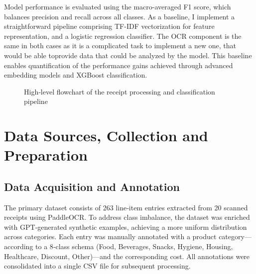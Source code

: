 \documentclass{SGGW-thesis-EN}
\begin{document}
Model performance is evaluated using the macro-averaged F1 score, which balances precision and recall across all classes. 
As a baseline, I implement a straightforward pipeline comprising TF-IDF vectorization for feature representation, 
and a logistic regression classifier. The OCR component is the same in both cases as it is a complicated task to implement a new one, 
that would be able toprovide data that could be analyzed by the model.
This baseline enables quantification of the performance gains achieved through advanced embedding models and XGBoost classification.

\begin{figure}[h!]
  \centering
  \caption{High‐level flowchart of the receipt processing and classification pipeline}
  \label{fig:pipeline_flowchart_vertical}
\end{figure}


\section{Data Sources, Collection and Preparation}

\subsection{Data Acquisition and Annotation}
The primary dataset consists of 263 line‐item entries extracted from 20 scanned receipts using PaddleOCR. To address class imbalance,
the dataset was enriched with GPT‐generated synthetic examples, achieving a more uniform distribution across categories. Each entry was manually annotated
with a product category— according to a  8‐class schema (Food, Beverages, Snacks, Hygiene,
Housing, Healthcare, Discount, Other)—and the corresponding cost. All annotations were consolidated into a single CSV file for subsequent processing.
\end{document}

